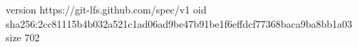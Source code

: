 version https://git-lfs.github.com/spec/v1
oid sha256:2cc81115b4b032a521c1ad06ad9be47b91be1f6effdcf77368baca9ba8bb1a03
size 702
